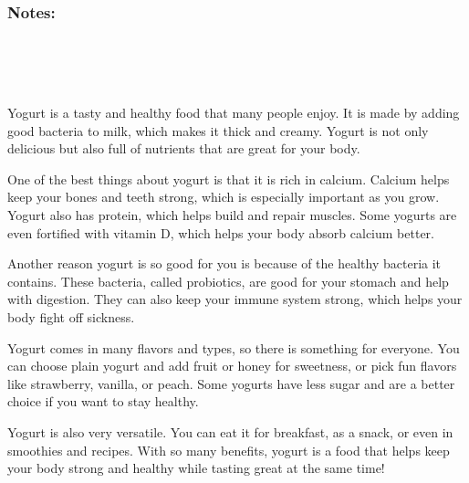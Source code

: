 \documentclass[12pt]{article}
\begin{document}
\vspace{1em}

\subsubsection*{Notes:}
\noindent \underline{\hspace{17cm}} \\[1.2cm]
\noindent \underline{\hspace{17cm}} \\[1.2cm]
\noindent \underline{\hspace{17cm}} \\[1.2cm]

\begin{tcolorbox}[colframe=black!60, colback=white, 
coltitle=black, colbacktitle=black!15, fonttitle=\bfseries\Large, 
title=Text: Why Eat Yogurt?, halign title=center, left=10pt, right=10pt, top=10pt, bottom=15pt]
Yogurt is a tasty and healthy food that many people enjoy. It is made by adding good bacteria to milk, which makes it thick and creamy. Yogurt is not only delicious but also full of nutrients that are great for your body.

One of the best things about yogurt is that it is rich in calcium. Calcium helps keep your bones and teeth strong, which is especially important as you grow. Yogurt also has protein, which helps build and repair muscles. Some yogurts are even fortified with vitamin D, which helps your body absorb calcium better.

Another reason yogurt is so good for you is because of the healthy bacteria it contains. These bacteria, called probiotics, are good for your stomach and help with digestion. They can also keep your immune system strong, which helps your body fight off sickness.

Yogurt comes in many flavors and types, so there is something for everyone. You can choose plain yogurt and add fruit or honey for sweetness, or pick fun flavors like strawberry, vanilla, or peach. Some yogurts have less sugar and are a better choice if you want to stay healthy.

Yogurt is also very versatile. You can eat it for breakfast, as a snack, or even in smoothies and recipes. With so many benefits, yogurt is a food that helps keep your body strong and healthy while tasting great at the same time!



 

     \end{tcolorbox}
\end{document}
